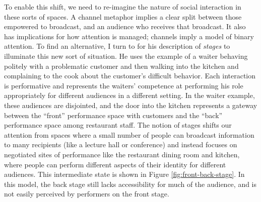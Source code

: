 


To enable this shift, we need to re-imagine the nature of social interaction in these sorts of spaces. A channel metaphor implies a clear split between those empowered to broadcast, and an audience who receives that broadcast. It also has implications for how attention is managed; channels imply a model of binary attention. To find an alternative, I turn to \citet{goffman_presentation_1959} for his description of \emph{stages} to illuminate this new sort of situation. He uses the example of a waiter behaving politely with a problematic customer and then walking into the kitchen and complaining to the cook about the customer's difficult behavior. Each interaction is performative and represents the waiters' competence at performing his role appropriately for different audiences in a different setting. In the waiter example, these audiences are disjointed, and the door into the kitchen represents a gateway between the ``front'' performance space with customers and the ``back'' performance space among restaurant staff. The notion of stages shifts our attention from spaces where a small number of people can broadcast information to many recipients (like a lecture hall or conference) and instead focuses on negotiated sites of performance like the restaurant dining room and kitchen, where people can perform different aspects of their identity for different audiences. This intermediate state is shown in Figure \ref{fig:front-back-stage}. In this model, the back stage still lacks accessibility for much of the audience, and is not easily perceived by performers on the front stage.

